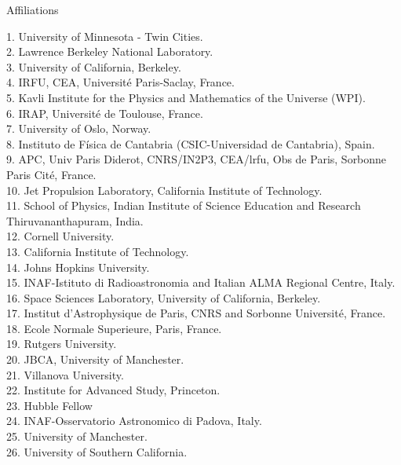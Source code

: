 \documentclass[PICOAPC.tex]{subfiles}
\begin{document}
\Large  {\centerline {Affiliations}}
\vspace{-6pt}
%
\begin{multicols}{2}
\raggedright
\scriptsize {
1. University of Minnesota - Twin Cities.  \\
2. Lawrence Berkeley National Laboratory.  \\
3. University of California, Berkeley.  \\
4. IRFU, CEA, Universit\'e Paris-Saclay, France.  \\
5. Kavli Institute for the Physics and Mathematics of the Universe (WPI).  \\
6. IRAP, Universit\'e de Toulouse, France.  \\
7. University of Oslo, Norway.  \\
8. Instituto de F\'isica de Cantabria (CSIC-Universidad de Cantabria), Spain.  \\
9. APC, Univ Paris Diderot, CNRS/IN2P3, CEA/lrfu, Obs de Paris, Sorbonne Paris Cit\'e, France.  \\
10. Jet Propulsion Laboratory, California Institute of Technology.  \\
11. School of Physics, Indian Institute of Science Education and Research Thiruvananthapuram, India.  \\
12. Cornell University.  \\
13. California Institute of Technology.  \\
14. Johns Hopkins University.  \\
15. INAF-Istituto di Radioastronomia and Italian ALMA Regional Centre, Italy.  \\
16. Space Sciences Laboratory, University of California, Berkeley.  \\
17. Institut d'Astrophysique de Paris, CNRS and Sorbonne Universit\'e, France.  \\
18. Ecole Normale Superieure, Paris, France.  \\
19. Rutgers University.  \\
20. JBCA, University of Manchester.  \\
21. Villanova University.  \\
22. Institute for Advanced Study, Princeton.  \\
23. Hubble Fellow          \\
24. INAF-Osservatorio Astronomico di Padova, Italy.  \\
25. University of Manchester.  \\
26. University of Southern California.  \\
}
\end{multicols}
\end{document}
